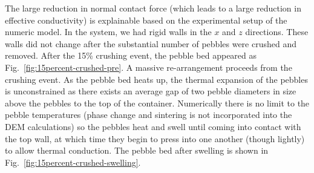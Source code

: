 The large reduction in normal contact force (which leads to a large reduction in effective conductivity) is explainable based on the experimental setup of the numeric model. In the system, we had rigid walls in the $x$ and $z$ directions. These walls did not change after the substantial number of pebbles were crushed and removed. After the 15\% crushing event, the pebble bed appeared as Fig.~\ref{fig:15percent-crushed-pre}. A massive re-arrangement proceeds from the crushing event. As the pebble bed heats up, the thermal expansion of the pebbles is unconstrained as there exists an average gap of two pebble diameters in size above the pebbles to the top of the container. Numerically there is no limit to the pebble temperatures (phase change and sintering is not incorporated into the DEM calculations) so the pebbles heat and swell until coming into contact with the top wall, at which time they begin to press into one another (though lightly) to allow thermal conduction. The pebble bed after swelling is shown in Fig.~\ref{fig:15percent-crushed-swelling}.

